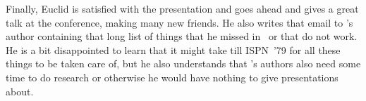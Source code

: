 Finally, Euclid is satisfied with the presentation and goes ahead and gives a great talk at the conference, making many new friends. He also writes that email to \beamer's author containing that long list of things that he missed in \beamer\ or that do not work. He is a bit disappointed to learn that it might take till ISPN~'79 for all these things to be taken care of, but he also understands that \beamer's authors also need some time to do research or otherwise he would have nothing to give presentations about.
